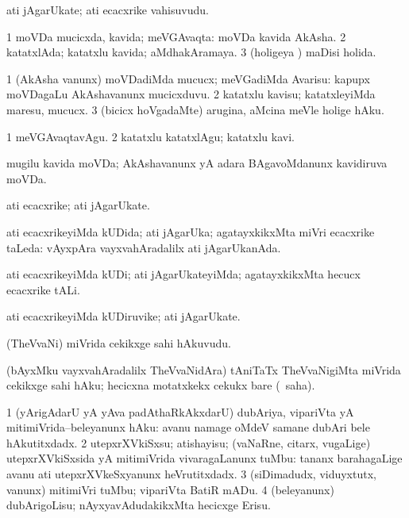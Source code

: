 \bentry
{}
\gl{\nA}
\bmng
ati jAgarUkate; ati ecacxrike vahisuvudu. 
\emng
\eentry

\bentry
{}
\gl{\gu}
\bmng
\bnum
\num{1} moVDa mucicxda, kavida; meVGAvaqta:  moVDa kavida AkAsha. 
\num{2} katatxlAda; katatxlu kavida; aMdhakAramaya. 
\num{3} (holigeya \vi) maDisi holida. 
\enum
\emng
\eentry

\bentry
{}
\gl{\sakirx}
\bmng
\bnum
\num{1} (AkAsha \mo vanunx) moVDadiMda mucucx; meVGadiMda Avarisu:  kapupx moVDagaLu AkAshavanunx mucicxduvu. 
\num{2} katatxlu kavisu; katatxleyiMda maresu, mucucx. 
\num{3} (bicicx hoVgadaMte) arugina, aMcina meVle holige hAku. 
\enum
\emng

\noindent
\gl{\akirx}
\bmng
\bnum
\num{1} meVGAvaqtavAgu. 
\num{2} katatxlu katatxlAgu; katatxlu kavi. 
\enum
\emng
\eentry

\bentry
{}
\gl{\nA}
\bmng
mugilu kavida moVDa; AkAshavanunx yA adara BAgavoMdanunx kavidiruva moVDa. 
\emng
\eentry

\bentry
{}
\gl{\nA}
\bmng
ati ecacxrike; ati jAgarUkate. 
\emng
\eentry

\bentry
{}
\gl{\gu}
\bmng
ati ecacxrikeyiMda kUDida; ati jAgarUka; agatayxkikxMta miVri ecacxrike taLeda:  vAyxpAra vayxvahAradalilx ati jAgarUkanAda. 
\emng
\eentry

\bentry
{}
\gl{\kirxvi}
\bmng
ati ecacxrikeyiMda kUDi; ati jAgarUkateyiMda; agatayxkikxMta hecucx ecacxrike tALi. 
\emng
\eentry

\bentry
{}
\gl{\nA}
\bmng
ati ecacxrikeyiMda kUDiruvike; ati jAgarUkate. 
\emng
\eentry

\bentry
{}
\gl{\nA}
\bmng
(TheVvaNi) miVrida cekikxge sahi hAkuvudu. 
\emng
\eentry

\bentry
{}
\gl{\sakirx}
\bmng
(bAyxMku vayxvahAradalilx TheVvaNidAra) tAniTaTx TheVvaNigiMta miVrida cekikxge sahi hAku; hecicxna motatxkekx cekukx bare (\sakirx\ saha). 
\emng
\eentry

\bentry
{}
\gl{\sakirx}
\bmng
\bnum
\num{1} (yArigAdarU yA yAva padAthaRkAkxdarU) dubAriya, vipariVta yA mitimiVrida--beleyanunx hAku:  avanu namage oMdeV samane dubAri bele hAkutitxdadx. 
\num{2} utepxrXVkiSxsu; atishayisu; (vaNaRne, citarx, \mo vugaLige) utepxrXVkiSxsida yA mitimiVrida vivaragaLanunx tuMbu:  tananx barahagaLige avanu ati utepxrXVkeSxyanunx heVrutitxdadx. 
\num{3} (siDimadudx, viduyxtutx, \mo vanunx) mitimiVri tuMbu; vipariVta BatiR mADu. 
\num{4} (beleyanunx) dubArigoLisu; nAyxyavAdudakikxMta hecicxge Erisu. 
\enum
\emng
\eentry

